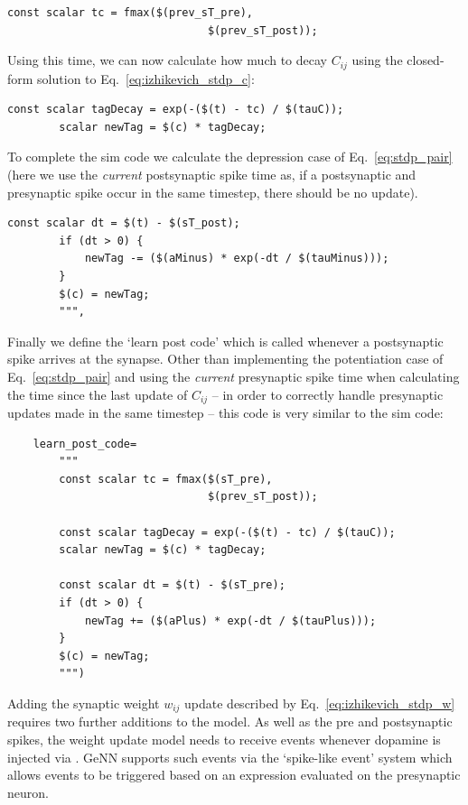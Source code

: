 \documentclass[utf8]{frontiersSCNS} %
\begin{document}
%
\begin{lstlisting}[identifierstyle=\color{Maroon}]
        const scalar tc = fmax($(prev_sT_pre), 
                               $(prev_sT_post));
\end{lstlisting}
%
Using this time, we can now calculate how much to decay $C_{ij}$ using the closed-form solution to Eq.~\ref{eq:izhikevich_stdp_c}:
%
\begin{lstlisting}[identifierstyle=\color{Maroon}]      
        const scalar tagDecay = exp(-($(t) - tc) / $(tauC));
        scalar newTag = $(c) * tagDecay;
\end{lstlisting}
%
To complete the sim code we calculate the depression case of Eq.~\ref{eq:stdp_pair} (here we use the \emph{current} postsynaptic spike time as, if a postsynaptic and presynaptic spike occur in the same timestep, there should be no update).
\begin{lstlisting}[identifierstyle=\color{Maroon},keywordstyle=\color{Maroon}]
        const scalar dt = $(t) - $(sT_post);
        if (dt > 0) {
            newTag -= ($(aMinus) * exp(-dt / $(tauMinus)));
        }
        $(c) = newTag;
        """,
\end{lstlisting}
%
Finally we define the `learn post code' which is called whenever a postsynaptic spike arrives at the synapse.
Other than implementing the potentiation case of Eq.~\ref{eq:stdp_pair} and using the \emph{current} presynaptic spike time when calculating the time since the last update of $C_{ij}$ -- in order to correctly handle presynaptic updates made in the same timestep -- this code is very similar to the sim code:
\begin{lstlisting}
    learn_post_code=
        """
        const scalar tc = fmax($(sT_pre), 
                               $(prev_sT_post));
        
        const scalar tagDecay = exp(-($(t) - tc) / $(tauC));
        scalar newTag = $(c) * tagDecay;
        
        const scalar dt = $(t) - $(sT_pre);
        if (dt > 0) {
            newTag += ($(aPlus) * exp(-dt / $(tauPlus)));
        }
        $(c) = newTag;
        """)
\end{lstlisting}
%
Adding the synaptic weight $w_{ij}$ update described by Eq.~\ref{eq:izhikevich_stdp_w} requires two further additions to the model.
As well as the pre and postsynaptic spikes, the weight update model needs to receive events whenever dopamine is injected via .
GeNN supports such events via the `spike-like event' system which allows events to be triggered based on an expression evaluated on the presynaptic neuron.
\end{document}
